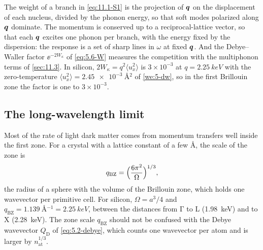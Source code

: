 The weight of a branch in \cref{eq:11.1-S1} is the projection of $\bm{q}$ on the displacement of each nucleus, divided by the phonon energy, so that soft modes polarized along $\bm{q}$ dominate. The momentum is conserved up to a reciprocal-lattice vector, so that each $\bm{q}$ excites one phonon per branch, with the energy fixed by the dispersion: the response is a set of sharp lines in $\omega$ at fixed $\bm{q}$. And the Debye--Waller factor $\ee^{-2W_\kappa}$ of \cref{eq:5.6-W} measures the competition with the multiphonon terms of \cref{sec:11.3}. In silicon, $2W_\kappa = q^2\langle u_x^2\rangle$ is $3\times10^{-3}$ at $q = \SI{2.25}{keV}$ with the zero-temperature $\langle u_x^2\rangle = \SI{2.45e-3}{\angstrom^2}$ of \cref{we:5-dw}, so in the first Brillouin zone the factor is one to $3\times10^{-3}$.

\subsection{The long-wavelength limit}

Most of the rate of light dark matter comes from momentum transfers well inside the first zone. For a crystal with a lattice constant of a few \si{\angstrom}, the scale of the zone is
\begin{equation}
  q_{\mathrm{BZ}} = \Bigl(\frac{6\pi^2}{\Omega}\Bigr)^{1/3} ,
  \label{eq:11.1-qBZ}
\end{equation}
the radius of a sphere with the volume of the Brillouin zone, which holds one wavevector per primitive cell. For silicon, $\Omega = a^3/4$ and $q_{\mathrm{BZ}} = \SI{1.139}{\angstrom^{-1}} = \SI{2.25}{keV}$, between the distances from $\mathrm{\Gamma}$ to L (\SI{1.98}{keV}) and to X (\SI{2.28}{keV}). The zone scale $q_{\mathrm{BZ}}$ should not be confused with the Debye wavevector $Q_{\mathrm{D}}$ of \cref{eq:5.2-debye}, which counts one wavevector per atom and is larger by $n_{\mathrm{at}}^{1/3}$.

